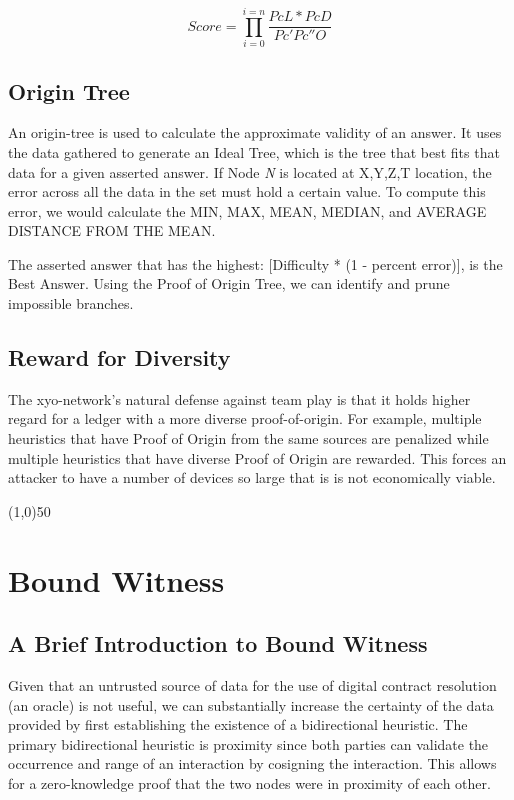 \documentclass{article}
\begin{document}
\begin{equation*}\tag{1} \label{eq1}
Score = \prod_{i=0}^{i=n} \frac{PcL*PcD}{Pc' Pc'' O}
\end{equation*}

\subsection {Origin Tree}
An \Gls{origin-tree} is used to calculate the approximate validity of an answer. It uses the data gathered to generate an Ideal Tree, which is the tree that best fits that data for a given asserted answer. If Node \textit{N} is located at X,Y,Z,T location, the error across all the data in the set must hold a certain value. To compute this error, we would calculate the MIN, MAX, MEAN, MEDIAN, and AVERAGE DISTANCE FROM THE MEAN.

The asserted answer that has the highest: [Difficulty * (1 - percent error)], is the Best Answer. Using the Proof of Origin Tree, we can identify and prune impossible branches.

\subsection {Reward for Diversity}
The \Gls{xyo-network}'s natural defense against team play is that it holds higher regard for a ledger with a more diverse \Gls{proof-of-origin}. For example, multiple \glspl{heuristic} that have Proof of Origin from the same sources are penalized while multiple heuristics that have diverse Proof of Origin are rewarded. This forces an attacker to have a number of devices so large that is is not economically viable.

\begin{center}
\line(1,0){50}
\end{center}

\section {Bound Witness}

\subsection {A Brief Introduction to Bound Witness}
Given that an untrusted source of data for the use of digital contract resolution (an \gls{oracle}) is not useful, we can substantially increase the \gls{certainty} of the data provided by first establishing the existence of a bidirectional \gls{heuristic}. The primary bidirectional heuristic is proximity since both parties can validate the occurrence and range of an interaction by cosigning the interaction. This allows for a zero-knowledge proof that the two nodes were in proximity of each other. 
\end{document}
